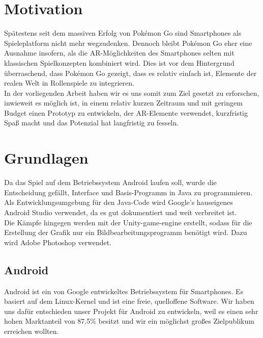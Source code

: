 \documentclass[extern,palatino]{cgBA}
\begin{document}
\section{Motivation}
Spätestens seit dem massiven Erfolg von Pokémon Go sind Smartphones als Spieleplatform nicht mehr wegzudenken. Dennoch bleibt Pokémon Go eher eine Ausnahme insofern, als die AR-Möglichkeiten des Smartphones selten mit klassischen Spielkonzepten kombiniert wird. Dies ist vor dem Hintergrund überraschend, dass Pokémon Go gezeigt, dass es relativ einfach ist, Elemente der realen Welt in Rollenspiele zu integrieren. \\In der vorliegenden Arbeit haben wir es uns somit zum Ziel gesetzt zu erforschen, inwieweit es möglich ist, in einem relativ kurzen Zeitraum und mit geringem Budget einen Prototyp zu entwickeln, der AR-Elemente verwendet, kurzfristig Spaß macht und das Potenzial hat langfristig zu fesseln.
\newpage
\section{Grundlagen}
Da das Spiel auf dem Betriebssystem Android laufen soll, wurde die Entscheidung gefällt, Interface und Basis-Programm in Java zu programmieren. Als Entwicklungsumgebung für den Java-Code wird Google's hauseigenes Android Studio verwendet, da es gut dokumentiert und weit verbreitet ist.
\\Die Kämpfe hingegen werden mit der Unity-game-engine erstellt, sodass für die Erstellung der Grafik nur ein Bildbearbeitungsprogramm benötigt wird. Dazu wird Adobe Photoshop verwendet.
\subsection{Android}
Android ist ein von Google entwickeltes Betriebssystem für Smartphones. Es basiert auf dem Linux-Kernel und ist eine freie, quelloffene Software. Wir haben uns dafür entschieden unser Projekt für Android zu entwickeln, weil es einen sehr hohen Marktanteil von 87.5\% besitzt und wir ein möglichst großes Zielpublikum erreichen wollten. 
\end{document}
